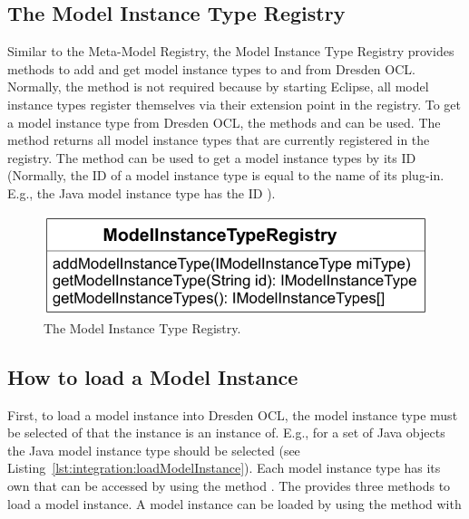 \subsection{The Model Instance Type Registry}

Similar to the Meta-Model Registry, the Model Instance Type Registry provides 
methods to add and get model instance types to and from Dresden OCL. Normally,
the method 
is not required because by starting Eclipse, all model instance types register themselves via 
their extension point in the registry. To get a model instance type from
Dresden OCL, the methods  and
 can be used. The method 
 returns all model instance types that are
currently registered in the registry. The method  can be used to get a model instance types by its ID (Normally, the ID 
of a model instance type is equal to the name of its plug-in. E.g., the Java 
model instance type has the ID 
).

\begin{figure}[!b]
	\centering
	\includegraphics[width=.7\linewidth]{figures/integration/modelInstanceTypeRegistry}
	\caption{The Model Instance Type Registry.}
	\label{pic:integration:modelInstanceTypeRegistry}
\end{figure}


\subsection{How to load a Model Instance}

First, to load a model instance into Dresden OCL, the model instance type must be
selected of that the instance is an instance of. E.g., for a set of Java objects
the Java model instance type should be selected (see 
Listing~\ref{lst:integration:loadModelInstance}). Each model instance type has
its own  that can be accessed by using the
method . The 
 provides three methods to load a model instance. 
A model instance can be loaded by using the method  
with

